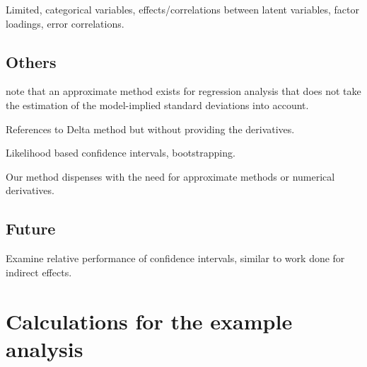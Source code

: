 \documentclass[a4paper, 11pt]{article}
\newcommand{\0}{\boldsymbol{0}}
\begin{document}
Limited, categorical variables, effects/correlations between latent variables,
factor loadings, error correlations.

\subsection{Others}
\cite{bollen1990direct} note that an approximate method exists for regression
analysis that does not take the estimation of the model-implied standard
deviations into account. 

References to Delta method but without providing the derivatives.

Likelihood based confidence intervals, bootstrapping.

Our method dispenses with the need for approximate methods or numerical
derivatives.

\subsection{Future}

Examine relative performance of confidence intervals, similar to work done for
indirect effects.




\appendix

\section{Calculations for the example analysis}
\end{document}
